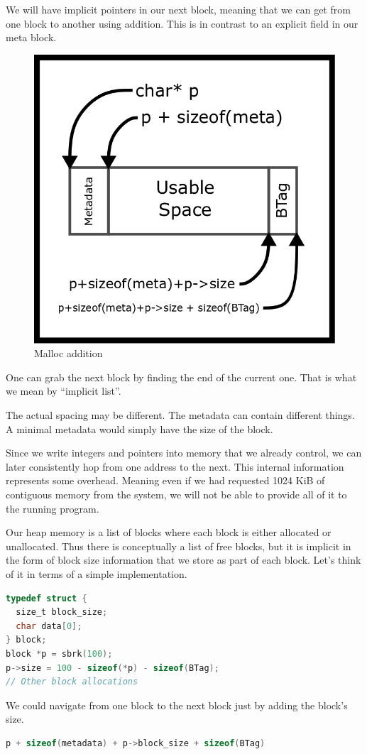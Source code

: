 We will have implicit pointers in our next block, meaning that we can get from one block to another using addition.
This is in contrast to an explicit  field in our meta block.

\begin{figure}[H]
\centering
\includegraphics[width=.5\textwidth]{malloc/drawings/malloc_addition.png}
\caption{Malloc addition}
\end{figure}

One can grab the next block by finding the end of the current one.
That is what we mean by ``implicit list''.

The actual spacing may be different.
The metadata can contain different things.
A minimal metadata would simply have the size of the block.

Since we write integers and pointers into memory that we already control, we can later consistently hop from one address to the next.
This internal information represents some overhead.
Meaning even if we had requested 1024 KiB of contiguous memory from the system, we will not be able to provide all of it to the running program.

Our heap memory is a list of blocks where each block is either allocated or unallocated.
Thus there is conceptually a list of free blocks, but it is implicit in the form of block size information that we store as part of each block.
Let's think of it in terms of a simple implementation.
\begin{lstlisting}[language=C]
typedef struct {
  size_t block_size;
  char data[0];
} block;
block *p = sbrk(100);
p->size = 100 - sizeof(*p) - sizeof(BTag);
// Other block allocations
\end{lstlisting}

We could navigate from one block to the next block just by adding the block's size.

\begin{lstlisting}[language=C]
p + sizeof(metadata) + p->block_size + sizeof(BTag)
\end{lstlisting}

